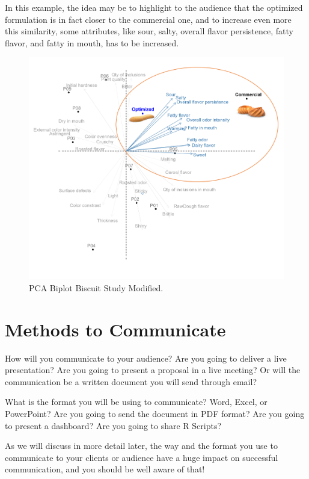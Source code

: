 \documentclass[
]{krantz}
\begin{document}
In this example, the idea may be to highlight to the audience that the optimized formulation is in fact closer to the commercial one, and to increase even more this similarity, some attributes, like sour, salty, overall flavor persistence, fatty flavor, and fatty in mouth, has to be increased.

\begin{figure}

{\centering \includegraphics[width=0.9\linewidth]{images/PCA_management} 

}

\caption{PCA Biplot Biscuit Study Modified.}\label{fig:pcamanagement}
\end{figure}

\hypertarget{methods-to-communicate}{%
\section{Methods to Communicate}\label{methods-to-communicate}}

How will you communicate to your audience? Are you going to deliver a live presentation? Are you going to present a proposal in a live meeting? Or will the communication be a written document you will send through email?

What is the format you will be using to communicate? Word, Excel, or PowerPoint? Are you going to send the document in PDF format? Are you going to present a dashboard? Are you going to share R Scripts?

As we will discuss in more detail later, the way and the format you use to communicate to your clients or audience have a huge impact on successful communication, and you should be well aware of that!
\end{document}

